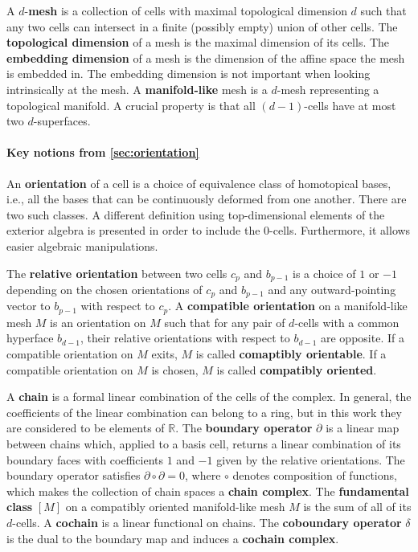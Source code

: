 \documentclass{elsarticle}
\theoremstyle{definition}
\newcommand{\R}{\mathbb{R}} %
\begin{document}
A $d$-\textbf{mesh} is a collection of cells with maximal topological dimension $d$ such that any two cells can intersect in a finite (possibly empty) union of other cells.
The \textbf{topological dimension} of a mesh is the maximal dimension of its cells.
The \textbf{embedding dimension} of a mesh is the dimension of the affine space the mesh is embedded in. The embedding dimension is not important when looking intrinsically at the mesh. A \textbf{manifold-like} mesh is a $d$-mesh representing a topological manifold. A crucial property is that all $(d - 1)$-cells have at most two $d$-superfaces.

\paragraph{Key notions from \ref{sec:orientation}}
An \textbf{orientation} of a cell is a choice of equivalence class of homotopical bases, i.e., all the bases that can be continuously deformed from one another. There are two such classes. A different definition using top-dimensional elements of the exterior algebra is presented in order to include the $0$-cells. Furthermore, it allows easier algebraic manipulations.

The \textbf{relative orientation} between two cells $c_p$ and $b_{p - 1}$ is a choice of $1$ or $-1$ depending on the chosen orientations of $c_p$ and $b_{p - 1}$ and any outward-pointing vector to $b_{p - 1}$ with respect to $c_p$.
A \textbf{compatible orientation} on a manifold-like mesh $M$ is an orientation on $M$ such that for any pair of $d$-cells with a common hyperface $b_{d-1}$, their relative orientations with respect to $b_{d-1}$ are opposite.
If a compatible orientation on $M$ exits, $M$ is called \textbf{comaptibly orientable}.
If a compatible orientation on $M$ is chosen, $M$ is called \textbf{compatibly oriented}.

A \textbf{chain} is a formal linear combination of the cells of the complex. In general, the coefficients of the linear combination can belong to a ring, but in this work they are considered to be elements of $\R$.
The \textbf{boundary operator} $\partial$ is a linear map between chains which, applied to a basis cell, returns a linear combination of its boundary faces with coefficients $1$ and $-1$ given by the relative orientations. The boundary operator satisfies $\partial \circ \partial = 0$, where $\circ$ denotes composition of functions, which makes the collection of chain spaces a \textbf{chain complex}.
The \textbf{fundamental class} $[M]$ on a compatibly oriented manifold-like mesh $M$ is the sum of all of its $d$-cells.
A \textbf{cochain} is a linear functional on chains.
The \textbf{coboundary operator} $\delta$ is the dual to the boundary map and induces a \textbf{cochain complex}.
\end{document}
